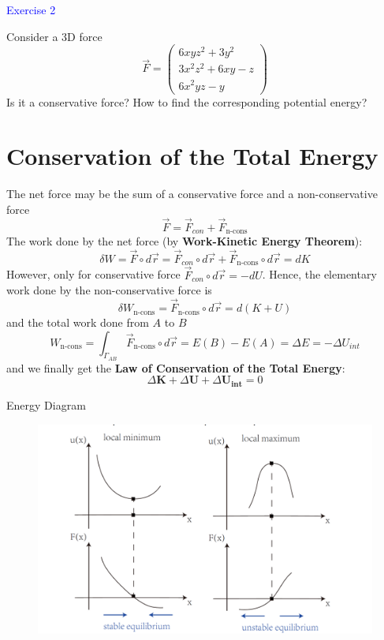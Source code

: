\documentclass{beamer}
\begin{document}
\begin{frame}
\textcolor{blue}{Exercise 2}

Consider a 3D force $$ \vec{F}=\left(\begin{array}{c}
  6xyz^2+3y^2\\
  3x^2z^2+6xy-z\\
  6x^2yz-y
  \end{array}\right)$$
  Is it a conservative force? How to find the corresponding potential energy?
\end{frame}

\section{Conservation of the Total Energy}
\begin{frame}
  The net force may be the sum of a conservative force and a non-conservative force$$\vec{F}=\vec{F}_{con}+\vec{F}_{\text {n-cons}}$$
   The work done by the net force (by \textbf{Work-Kinetic Energy Theorem}):
$$
\delta W=\vec{F} \circ d \vec{r}=\vec{F}_{con } \circ d \vec{r}+\vec{F}_{\text {n-cons}} \circ d\vec{r} =d K
$$
However, only for conservative force $\vec{F}_{con} \circ d \vec{r}=-d U$. Hence, the elementary work done by the non-conservative force is
$$
\delta W_{\text {n-cons}}=\vec{F}_{\text {n-cons}} \circ d \vec{r}=d(K+U)
$$
and the total work done from $A$ to $B$
$$
W_{\text {n-cons}}=\int_{\Gamma_{A B}} \vec{F}_{\text {n-cons}} \circ d\vec{r}=E(B)-E(A)=\Delta E = -\Delta U_{int}
$$
and we finally get the \textbf{Law of Conservation of the Total Energy}:
$$
\Delta\mathbf{K} + \Delta \mathbf{U} +\Delta \mathbf{U_{int}} = 0
$$
\end{frame}

\begin{frame}{Energy Diagram}
  \begin{figure}[htbp]
  \centering
  \includegraphics[width= 0.9\linewidth, angle =0]{EnergyDiagram.png}
  \label{fig:1}
  \end{figure}
\end{frame}
\end{document}
